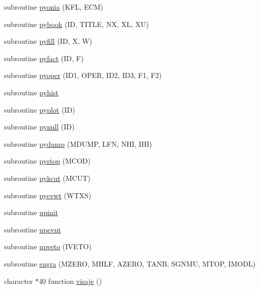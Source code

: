 \begin{DoxyCompactItemize}
\item 
subroutine \hyperlink{pythia-6_84_824_8f_ace9552b2e1344c48ed7250f2caf5b672}{pyonia} (K\+F\+L, E\+C\+M)
\item 
subroutine \hyperlink{pythia-6_84_824_8f_a06a98b7423ece43b210d6e86912b5cc9}{pybook} (I\+D, T\+I\+T\+L\+E, N\+X, X\+L, X\+U)
\item 
subroutine \hyperlink{pythia-6_84_824_8f_a3bbf2f94a5098ff68a11783d9aabd885}{pyfill} (I\+D, X, W)
\item 
subroutine \hyperlink{pythia-6_84_824_8f_a9c82afe1bb032cc74f105ca96bc7a324}{pyfact} (I\+D, F)
\item 
subroutine \hyperlink{pythia-6_84_824_8f_a5d3b26589df67004ca5293b12d16fd29}{pyoper} (I\+D1, O\+P\+E\+R, I\+D2, I\+D3, F1, F2)
\item 
subroutine \hyperlink{pythia-6_84_824_8f_afc107507b3587fc19c0008503f5b6a2a}{pyhist}
\item 
subroutine \hyperlink{pythia-6_84_824_8f_af28a134735bfae02911917eb71c7f64b}{pyplot} (I\+D)
\item 
subroutine \hyperlink{pythia-6_84_824_8f_a49f22066d04601429fc3a754c7496366}{pynull} (I\+D)
\item 
subroutine \hyperlink{pythia-6_84_824_8f_a20a3192b9213b8f1ecea4b1519dcffc1}{pydump} (M\+D\+U\+M\+P, L\+F\+N, N\+H\+I, I\+H\+I)
\item 
subroutine \hyperlink{pythia-6_84_824_8f_a4140396b9ec9bafcebf4c7ebecb462e7}{pystop} (M\+C\+O\+D)
\item 
subroutine \hyperlink{pythia-6_84_824_8f_aa0d00f200e99efa1612d9551bd6fa140}{pykcut} (M\+C\+U\+T)
\item 
subroutine \hyperlink{pythia-6_84_824_8f_a5799e48fb2bcb7e50b682d42162bb5c4}{pyevwt} (W\+T\+X\+S)
\item 
subroutine \hyperlink{pythia-6_84_824_8f_aec7740054c676cf077fa61911c75a152}{upinit}
\item 
subroutine \hyperlink{pythia-6_84_824_8f_a3e6163857666f9911e3a4a6af4ff5fa0}{upevnt}
\item 
subroutine \hyperlink{pythia-6_84_824_8f_a43c4225aee761c5da2aa460915d635e1}{upveto} (I\+V\+E\+T\+O)
\item 
subroutine \hyperlink{pythia-6_84_824_8f_a0a9ab2acbdfa0c53863d0570d5c8195e}{sugra} (M\+Z\+E\+R\+O, M\+H\+L\+F, A\+Z\+E\+R\+O, T\+A\+N\+B, S\+G\+N\+M\+U, M\+T\+O\+P, I\+M\+O\+D\+L)
\item 
character $\ast$40 function \hyperlink{pythia-6_84_824_8f_a86533917dbffaccdf34edd0843bb7dcb}{visaje} ()
\item 

\end{DoxyCompactItemize}
